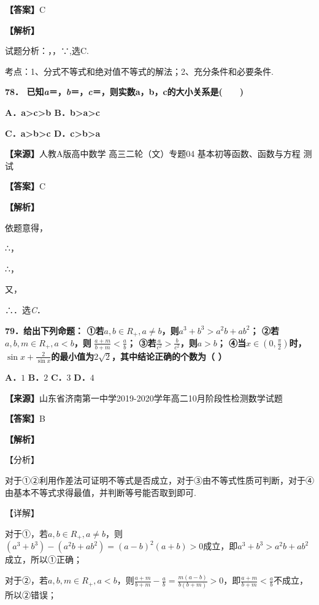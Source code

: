 \textbf{【答案】}C

\textbf{【解析】}

试题分析：，，∵,选C.

考点：1、分式不等式和绝对值不等式的解法；2、充分条件和必要条件.

\textbf{78．
已知\emph{a}＝，\emph{b}＝，\emph{c}＝，则实数a，b，c的大小关系是(　　)}

\textbf{A．a\textgreater c\textgreater b
B．b\textgreater a\textgreater c}

\textbf{C．a\textgreater b\textgreater c
D．c\textgreater b\textgreater a}

\textbf{【来源】}人教A版高中数学 高三二轮（文）专题04
基本初等函数、函数与方程 测试

\textbf{【答案】}C

\textbf{【解析】}

依题意得，

∴，

∴，

又，

∴．选\emph{C}．

\textbf{79．给出下列命题：
①若}\(a,b \in R_{+},a \neq b\)\textbf{，则}\(a^{3} + b^{3} > a^{2}b + ab^{2}\)\textbf{；
②若}\(a,b,m \in R_{+},a < b\)\textbf{，则}
\(\frac{a + m}{b + m} < \frac{a}{b}\)\textbf{；
③若}\(\frac{a}{c^{2}} > \frac{b}{c^{2}}\)\textbf{，则}\(a > b\)\textbf{；
④当}\(x \in \left( 0,\frac{\pi}{2} \right)\)\textbf{时，}\(\sin x + \frac{2}{\sin x}\)\textbf{的最小值为}\(2\sqrt{2}\)\textbf{，其中结论正确的个数为（
）}

\textbf{A．}\(1\) \textbf{B．}\(2\) \textbf{C．}\(3\) \textbf{D．}\(4\)

\textbf{【来源】}山东省济南第一中学2019-2020学年高二10月阶段性检测数学试题

\textbf{【答案】}B

\textbf{【解析】}

【分析】

对于①②利用作差法可证明不等式是否成立，对于③由不等式性质可判断，对于④由基本不等式求得最值，并判断等号能否取到即可.

【详解】

对于①，若\(a,b \in R_{+},a \neq b\)，则\(\left( a^{3} + b^{3} \right) - \left( a^{2}b + ab^{2} \right) = \left( a - b \right)^{2}\left( a + b \right) > 0\)成立，即\(a^{3} + b^{3} > a^{2}b + ab^{2}\)成立，所以①正确；

对于②，若\(a,b,m \in R_{+},a < b\)，则\(\frac{a + m}{b + m} - \frac{a}{b} = \frac{m\left( a - b \right)}{b\left( b + m \right)} > 0\)，即\(\frac{a + m}{b + m} < \frac{a}{b}\)不成立，所以②错误；

